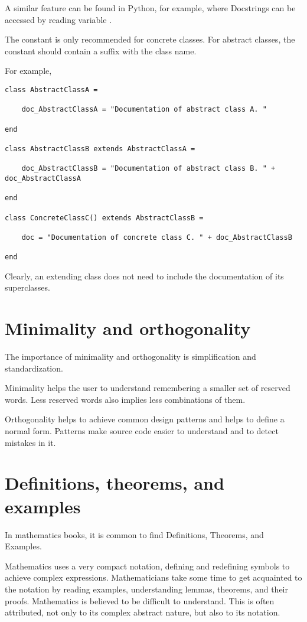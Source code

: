 A similar feature can be found in Python, for example, where Docstrings can be accessed by reading variable .

The  constant is only recommended for concrete classes.
For abstract classes, the constant should contain a suffix with the class name.

For example,
\begin{lstlisting}[label={lst:exampleAbstractAndConcreteClassesWithComment}]
class AbstractClassA =

    doc_AbstractClassA = "Documentation of abstract class A. "

end

class AbstractClassB extends AbstractClassA =

    doc_AbstractClassB = "Documentation of abstract class B. " + doc_AbstractClassA

end

class ConcreteClassC() extends AbstractClassB =

    doc = "Documentation of concrete class C. " + doc_AbstractClassB

end
\end{lstlisting}

Clearly, an extending class does not need to include the documentation of its superclasses.


\section{Minimality and orthogonality}

The importance of minimality and orthogonality is simplification and standardization.

Minimality helps the user to understand remembering a smaller set of reserved words.
Less reserved words also implies less combinations of them.

Orthogonality helps to achieve common design patterns and helps to define a normal form.
Patterns make source code easier to understand and to detect mistakes in it.


\section{Definitions, theorems, and examples}

In mathematics books, it is common to find Definitions, Theorems, and Examples.

Mathematics uses a very compact notation, defining and redefining symbols to achieve complex expressions.
Mathematicians take some time to get acquainted to the notation by reading examples, understanding lemmas, theorems, and their proofs.
Mathematics is believed to be difficult to understand.
This is often attributed, not only to its complex abstract nature, but also to its notation.

